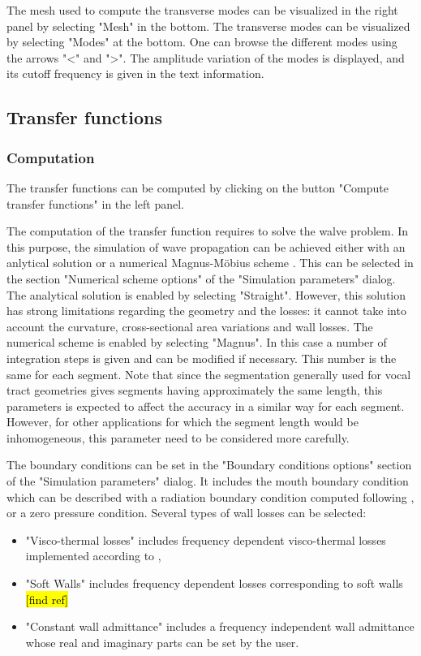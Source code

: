\documentclass[]{article}
\begin{document}
	The mesh used to compute the transverse modes can be visualized
	in the right panel by selecting "Mesh" in the bottom.
	The transverse modes can be visualized by 
	selecting "Modes" at the bottom. 
	One can browse the different modes using the arrows "<" and ">".
	The amplitude variation of the modes is displayed, and its cutoff 
	frequency is given in the text information.
	
	\subsection{Transfer functions}
	
	\subsubsection{Computation}
	
	The transfer functions can be computed by clicking on the button 
	"Compute transfer functions" in the left panel.
	
	The computation of the transfer function requires to solve the 
	walve problem. In this purpose, the simulation of wave propagation can be achieved either with an anlytical 
	solution \cite{blandin2015effects} or a numerical Magnus-Möbius 
	scheme \cite{PAGNEUX20101834}.
	This can be selected in the section "Numerical scheme options" of
	the "Simulation parameters" dialog. The analytical solution is 
	enabled by selecting "Straight". However, this solution has strong limitations regarding the geometry and the losses: it cannot take into account the curvature, cross-sectional area variations and 
	wall losses. The numerical scheme is enabled by selecting "Magnus".
	In this case a number of integration steps is given and can be 
	modified if necessary. This number is the same for each segment.
	Note that since the segmentation generally used for vocal tract geometries gives segments having approximately the same length, 
	this parameters is expected to affect the accuracy in a similar way
	for each segment. However, for other applications for which the 
	segment length would be inhomogeneous, this parameter need to be considered more carefully.
	
	The boundary conditions can be set in the "Boundary conditions options" section of the "Simulation parameters" dialog. 
	It includes the mouth boundary condition which can be described
	with a radiation boundary condition computed following 
	\textcite{blandin2019multimodal},
	or a zero pressure condition.
	Several types of wall losses can be selected: 
	\begin{itemize}
		\item "Visco-thermal losses" includes frequency dependent 
		visco-thermal losses implemented according to 
		\textcite{bruneau1987boundary},
		\item "Soft Walls" includes frequency dependent losses 
		corresponding to soft walls \hl{[find ref]}
		\item "Constant wall admittance" includes a frequency
		independent wall admittance whose real and imaginary parts 
		can be set by the user.
	\end{itemize}
\end{document}
